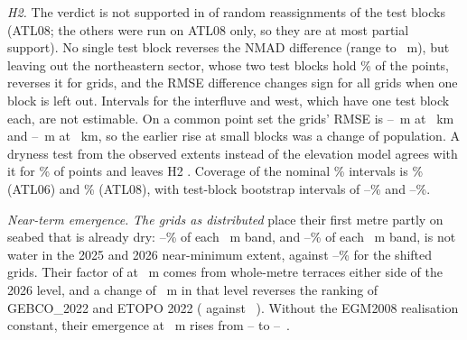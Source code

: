 \emph{H2.} The verdict is not supported in  of  random reassignments of the test blocks (ATL08; the  others were run on ATL08 only, so they are at most partial support). No single test block reverses the NMAD difference (range  to ~m), but leaving out the northeastern sector, whose two test blocks hold \% of the points, reverses it for  grids, and the RMSE difference changes sign for all  grids when one block is left out. Intervals for the interfluve and west, which have one test block each, are not estimable. On a common point set the grids' RMSE is --~m at ~km and --~m at ~km, so the earlier rise at small blocks was a change of population. A dryness test from the observed extents instead of the elevation model agrees with it for \% of points and leaves H2 . Coverage of the nominal \% intervals is \% (ATL06) and \% (ATL08), with test-block bootstrap intervals of --\% and --\%.

\emph{Near-term emergence.} \emph{The grids as distributed} place their first metre partly on seabed that is already dry: --\% of each ~m band, and --\% of each ~m band, is not water in the 2025 and 2026 near-minimum extent, against --\% for the shifted grids. Their factor of  at ~m comes from whole-metre terraces either side of the 2026 level, and a change of ~m in that level reverses the ranking of GEBCO\_2022 and ETOPO 2022 ( against ~\kmsq{}). Without the EGM2008 realisation constant, their emergence at ~m rises from -- to --~\kmsq{}.

